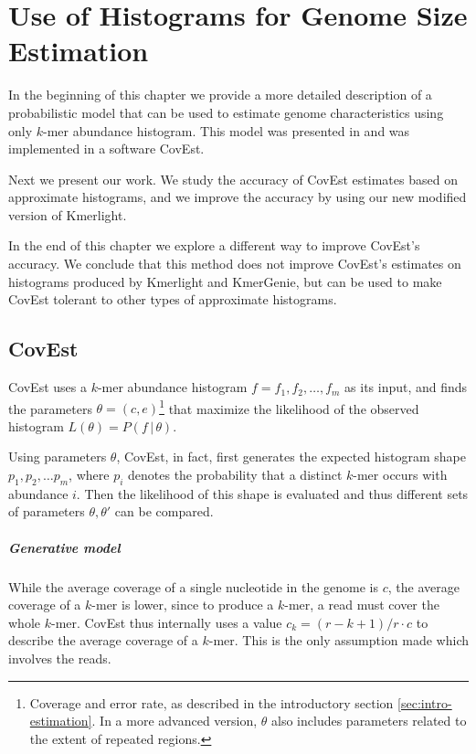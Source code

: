 \chapter{Use of Histograms for Genome Size Estimation}
\label{sec:chapter3}
In the beginning of this chapter we provide a more detailed description of a probabilistic model
that can be used to estimate genome characteristics using only $k$-mer abundance histogram.
This model was presented in \cite{Hozza2015, Hozza2016} and was implemented in a software CovEst.

Next we present our work. We study the accuracy of CovEst estimates based on
approximate histograms, and we improve the accuracy by using our new modified version of Kmerlight.

In the end of this chapter we explore a different way to improve CovEst's accuracy. 
We conclude that this method does not improve CovEst's estimates on histograms produced by
Kmerlight and KmerGenie, but can be used to make CovEst tolerant to other types of
approximate histograms.

\section{CovEst}
\label{sec:covest}
CovEst uses a $k$-mer abundance histogram $f = f_1, f_2, \dots, f_m$ as its input,
and finds the parameters $\theta = (c, e)$\footnote{Coverage and error rate, as described 
in the introductory section \ref{sec:intro-estimation}. In a more advanced version, $\theta$
also includes parameters related to the extent of repeated regions.} that maximize
the likelihood of the observed histogram $L(\theta) = P(f \,|\, \theta)$.

Using parameters $\theta$, CovEst, in fact, first generates the expected histogram
shape $p_1, p_2, \dots p_m$, where $p_i$ denotes the probability that a distinct $k$-mer
occurs with abundance $i$. Then the likelihood of this shape is evaluated and thus 
different sets of parameters $\theta, \theta'$ can be compared.

\paragraph{Generative model}
While the average coverage of a single nucleotide in the genome is $c$, the average coverage
of a $k$-mer is lower, since to produce a $k$-mer, a read must cover the whole
$k$-mer. CovEst thus internally uses a value $c_k = (r-k+1)/r \cdot c$ to describe the
average coverage of a $k$-mer. This is the only assumption made which involves the reads.

